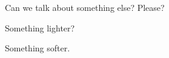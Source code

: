 \begin{paracol}{2}
  \begin{leftcolumn}

\null
\vfill
\noindent Can we talk about something else? Please?

\begin{ally}
Something lighter?
\end{ally}
Something softer.
\vfill
\newpage

\end{leftcolumn}
\end{paracol}
